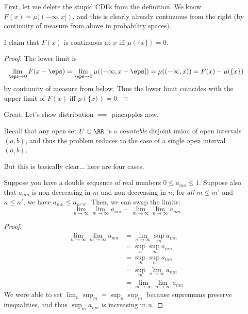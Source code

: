 \documentclass[11pt, headheight=30pt]{scrartcl}
\begin{document}
First, let me delete the stupid CDFs from the definition.
We know $F(x) = \mu((-\infty, x])$,
and this is clearly already continuous from the right
(by continuity of measure from above in probability spaces).
\begin{claim*}
    I claim that $F(x)$ is continuous at $x$ iff $\mu(\{x\}) = 0$.
\end{claim*}
\begin{proof}
    The lower limit is
    \[
        \lim_{\eps\to 0} F(x - \eps) = \lim_{\eps\to 0} \mu((-\infty, x - \eps]) = \mu((-\infty, x)) = F(x) - \mu(\{x\})
    \]
    by continuity of measure from below. Thus the lower limit
    coincides with the upper limit of $F(x)$ iff $\mu(\{x\}) = 0$.
\end{proof}

Great. Let's show distribution $\implies$ pineapples now.

Recall that any open set $U\subset \RR$ is a \emph{countable}
disjoint union of open intervals $(a,b)$, and thus the problem reduces
to the case of a single open interval $(a,b)$.

But this is basically clear... here are four cases.
\begin{itemize}
\end{itemize}



\begin{claim*}
    Suppose you have a double sequence of real numbers $0\leq a_{mn}\leq 1$.
    Suppose also that $a_{mn}$ is non-decreasing in $m$ and non-decreasing in $n$;
    for \emph{all} $m \leq m'$ and $n \leq n'$, we have $a_{mn} \leq a_{m'n'}$.
    Then, we can swap the limits:
    \[
        \lim_{n\to \infty}\lim_{m\to \infty} a_{mn} = \lim_{m\to \infty}\lim_{n\to \infty} a_{mn}
    \]
\end{claim*}
\begin{proof}
    \begin{align*}
        \lim_{n\to \infty}\lim_{m\to\infty} a_{mn}
        &= \lim_{n\to \infty} \sup_{m} a_{mn} \\
        &= \sup_{n} \sup_{m} a_{mn} \\
        &= \sup_{m} \sup_{n} a_{mn} \\
        &= \sup_{m} \lim_{n\to \infty} a_{mn} \\
        &= \lim_{m\to \infty} \lim_{n\to \infty} a_{mn}
    \end{align*}
    We were able to set $\lim_n\sup_m = \sup_n\sup_m$
    because supremums preserve inequalities, and
    thus $\sup_{m} a_{mn}$ is increasing in $n$.
\end{proof}
\end{document}
